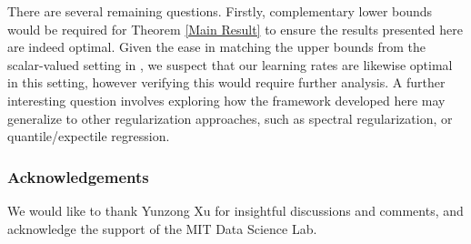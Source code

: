 \documentclass[accepted]{article}
\theoremstyle{definition}
\begin{document}
There are several remaining questions. Firstly, complementary lower bounds would be required for Theorem \ref{Main Result} to ensure the results presented here are indeed optimal. Given the ease in matching the upper bounds from the scalar-valued setting in \cite{fischer2020sobolev}, we suspect that our learning rates are likewise optimal in this setting, however verifying this would require further analysis. A further interesting question involves exploring how the framework developed here may generalize to other regularization approaches, such as spectral regularization, or quantile/expectile regression. 

\subsubsection*{Acknowledgements}
We would like to thank Yunzong Xu for insightful discussions and comments, and acknowledge the support of the MIT Data Science Lab. 





\end{document}
